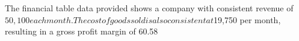 

The financial table data provided shows a company with consistent revenue of $50,100 each month. The cost of goods sold is also consistent at $19,750 per month, resulting in a gross profit margin of 60.58%